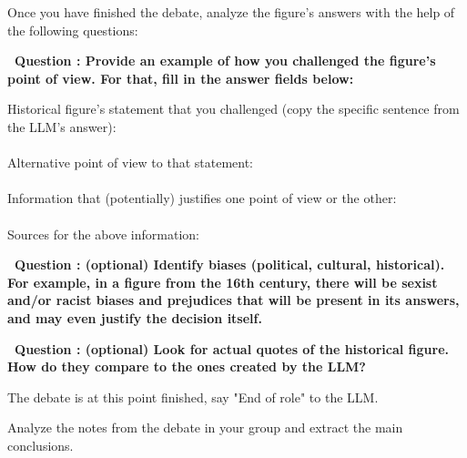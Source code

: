 \documentclass[12pt]{article}
\newcounter{exercise}
\newcommand{\exercisetitle}[1]{%
\stepcounter{exercise}
  \vspace{0.5cm}
  \colorbox{maincolor}{%
    \makebox[\dimexpr\linewidth-2\fboxsep][l]{%
      \textcolor{white}{\faPen\ Assignment \theexercise #1}%
    }%
  }
  \vspace{0.3cm}
}
\newcounter{question}
\newcommand{\question}[2][5cm]{%
  \stepcounter{question}
  \vspace{0.3cm}
  \textbf{\faEdit\ Question \thequestion: #2} \\[0.3em]
  
  \begin{Form}
  \TextField[
    name=Q\thequestion,
    multiline=true,
    width=\linewidth,
    height=#1,
    charsize=10pt,
    bordercolor={0 0 0},
    borderwidth=1.8,
    backgroundcolor={1 1 1}
  ]{}
  \end{Form}
  
  \vspace{0.3cm}
}
\begin{document}
Once you have finished the debate, analyze the figure's answers with the help of the following questions: 

  \vspace{0.3cm}
  \textbf{\faEdit\ Question \thequestion: Provide an example of how you challenged the figure's point of view. For that, fill in the answer fields below:} \\[0.3em]
  
  \begin{Form}


Historical figure's statement that you challenged (copy the specific sentence from the LLM's answer): \\[0.2cm]
\TextField[name=figstatement,width=\linewidth,height=2cm, bordercolor={0 0 0}]{} \\[0.2cm]

Alternative point of view to that statement: \\[0.2cm]
\TextField[name=pov,width=\linewidth,height=2cm,multiline=true, bordercolor={0 0 0}]{}\\[0.2cm]

Information that (potentially) justifies one point of view or the other: \\[0.2cm]
\TextField[name=information,width=\linewidth,height=4cm, bordercolor={0 0 0}]{} \\[0.2cm]

Sources for the above information: \\[0.2cm]
\TextField[name=sources,width=\linewidth,height=2cm,multiline=true, bordercolor={0 0 0}]{}

\end{Form}

\question{(optional) Identify biases (political, cultural, historical). For example, in a figure from the 16th century, there will be sexist and/or racist biases and prejudices that will be present in its answers, and may even justify the decision itself.}

\question{(optional) Look for actual quotes of the historical figure. How do they compare to the ones created by the LLM?}

\begin{importantbox}
    The debate is at this point finished, say "End of role" to the LLM.
\end{importantbox}

\exercisetitle{: Conclusions and analysis}

Analyze the notes from the debate in your group and extract the main conclusions.
\end{document}
